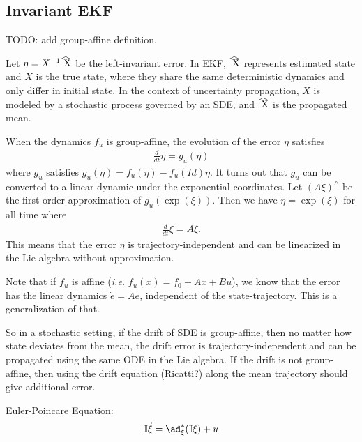 \documentclass[12pt,class=article,crop=false]{standalone}
\begin{document}
\subsection{Invariant EKF}
TODO: add group-affine definition. 

Let $ \eta = X^{-1} \wh{ X} $ be the left-invariant error. In EKF, $ \wh{ X}$ represents estimated state and $ X$ is the true state, where they share the same deterministic dynamics and only differ in initial state. In the context of uncertainty propagation, $ X$ is modeled by a stochastic process governed by an SDE, and $ \wh{ X}$ is the propagated mean.

When the dynamics $ f_u$ is group-affine, the evolution of the error $ \eta$ satisfies
\begin{align*}
	\frac{d}{dt} \eta = g_u (\eta)
\end{align*}
where $ g_u$ satisfies $ g_u(\eta) = f_u(\eta) - f_u( Id) \eta$. It turns out that $ g_u$ can be converted to a linear dynamic under the exponential coordinates. Let  $ (A \xi) ^\wedge$ be the first-order approximation of  $ g_u (\exp (\xi))$. Then we have $ \eta = \exp( \xi)$ for all time where
\begin{align*}
	\frac{d}{dt} \xi = A \xi .
\end{align*}
This means that the error $ \eta$ is trajectory-independent and can be linearized in the Lie algebra without approximation. 

Note that if $ f_u$ is affine (\emph{i.e.} $ f_u(x) = f_0 + Ax + Bu$), we know that the error has the linear dynamics  $ \dot{e} = A e$, independent of the state-trajectory. This is a generalization of that.

So in a stochastic setting, if the drift of SDE is group-affine, then no matter how state deviates from the mean, the drift error is trajectory-independent and can be propagated using the same ODE in the Lie algebra. If the drift is not group-affine, then using the drift equation (Ricatti?) along the mean trajectory should give additional error.

Euler-Poincare Equation:
\begin{align*}
	\mathbb{I} \dot{\xi} = \ad_{ \xi}^* ( \mathbb{I} \xi) + u 
\end{align*}
\end{document}
